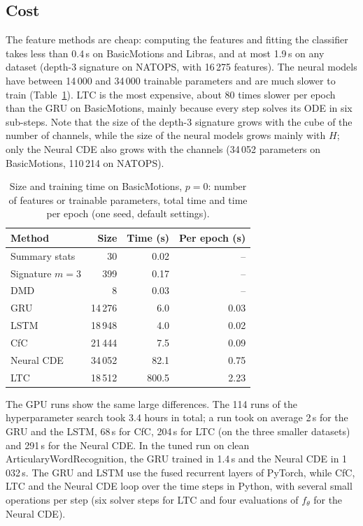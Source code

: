 \subsection{Cost}\label{sec:cost}

The feature methods are cheap: computing the features and fitting the
classifier takes less than 0.4\,s on BasicMotions and Libras, and at most
1.9\,s on any dataset (depth-3 signature on NATOPS, with 16\,275
features). The neural models have between 14\,000 and 34\,000 trainable
parameters and are much slower to train (Table~\ref{tab:cost}). LTC is the
most expensive, about 80 times slower per epoch than the GRU on
BasicMotions, mainly because every step solves its ODE in six sub-steps. Note
that the size of the depth-3 signature grows with the cube of the number
of channels, while the size of the neural models grows mainly with $H$;
only the Neural CDE also grows with the channels (34\,052 parameters on
BasicMotions, 110\,214 on NATOPS).

\begin{table}[ht]
\centering
\caption{Size and training time on BasicMotions, $p = 0$: number of
features or trainable parameters, total time and time per epoch (one
seed, default settings).}
\label{tab:cost}
\begin{tabular}{lrrr}
\toprule
Method & Size & Time (s) & Per epoch (s) \\
\midrule
Summary stats & 30 & 0.02 & -- \\
Signature $m=3$ & 399 & 0.17 & -- \\
DMD & 8 & 0.03 & -- \\
GRU & 14\,276 & 6.0 & 0.03 \\
LSTM & 18\,948 & 4.0 & 0.02 \\
CfC & 21\,444 & 7.5 & 0.09 \\
Neural CDE & 34\,052 & 82.1 & 0.75 \\
LTC & 18\,512 & 800.5 & 2.23 \\
\bottomrule
\end{tabular}
\end{table}

The GPU runs show the same large differences. The 114 runs of the hyperparameter
search took 3.4 hours in total; a run took on average 2\,s for the GRU and
the LSTM, 68\,s for CfC, 204\,s for LTC (on the three smaller datasets) and
291\,s for the Neural CDE. In the tuned run on clean
ArticularyWordRecognition, the GRU trained in 1.4\,s and the Neural CDE in
1\,032\,s. The GRU and LSTM use the fused recurrent layers of PyTorch,
while CfC, LTC and the Neural CDE loop over the time steps in Python, with
several small operations per step (six solver steps for LTC and four
evaluations of $f_\theta$ for the Neural CDE).

